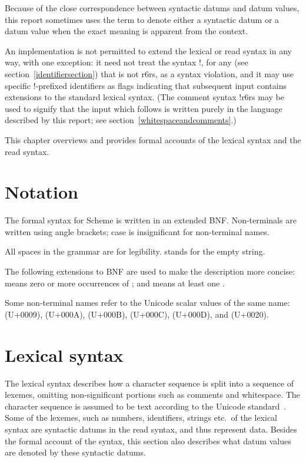 Because of the close correspondence between syntactic datums and datum
values, this report sometimes uses the term  to denote
either a syntactic datum or a datum value when the exact meaning
is apparent from the context.

An implementation is not permitted to extend the lexical or read syntax in
any way, with one exception: it need not treat the syntax
{\cf \sharpsign{}!}, for any  (see
section~\ref{identifiersection}) that is not {\cf r6rs}, as a syntax
violation, and it may use specific {\cf \sharpsign{}!}-prefixed
identifiers as flags indicating that subsequent input contains extensions
to the standard lexical syntax. 
(The comment syntax {\cf \sharpsign{}!r6rs} may be used to signify that
the input which follows is written purely in the language described by
this report; see section~\ref{whitespaceandcomments}.)

This chapter overviews and provides formal accounts of the lexical
syntax and the read syntax.

\section{Notation}
\label{BNF}

The formal syntax for Scheme is written in an extended BNF.
Non-terminals are written using angle brackets; case is insignificant
for non-terminal names.

All spaces in the grammar are for legibility.
 stands for the empty string.

The following extensions to BNF are used to make the description more
concise:   means zero or more occurrences of
; and  means at least one
.

Some non-terminal names refer to the Unicode scalar values of the
same name:  (U+0009), 
(U+000A),  (U+000B),  (U+000C),
 (U+000D), and  (U+0020).

\section{Lexical syntax}
\label{lexicalsyntaxsection}

The lexical syntax describes how a character sequence is split into a
sequence of lexemes, omitting non-significant portions
such as comments and whitespace.  The character sequence is assumed to
be text according to the Unicode standard~\cite{Unicode}.  Some of
the lexemes, such as numbers, identifiers, strings etc.\ of the lexical
syntax are syntactic datums in the read syntax, and thus represent data.
Besides the formal account of the syntax, this section also describes
what datum values are denoted by these syntactic datums.

